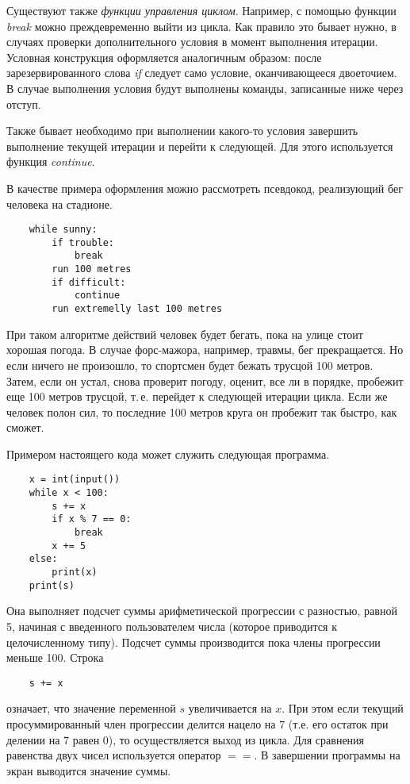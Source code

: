 \documentclass[a4paper, fleqn]{article}
\begin{document}
	Существуют также \emph{функции управления циклом}. Например, с помощью функции \emph{break} можно преждевременно выйти из цикла. Как правило это бывает нужно, в случаях проверки дополнительного условия в момент выполнения итерации. Условная конструкция оформляется аналогичным образом: после зарезервированного слова \emph{if} следует само условие, оканчивающееся двоеточием. В случае выполнения условия будут выполнены команды, записанные ниже через отступ.
	
	Также бывает необходимо при выполнении какого-то условия завершить выполнение текущей итерации и перейти к следующей.
	Для этого используется функция \emph{continue}.
	
	В качестве примера оформления можно рассмотреть псевдокод, реализующий бег человека на стадионе.
	\begin{lstlisting}
	while sunny:
		if trouble:
			break
		run 100 metres
		if difficult:
			continue
		run extremelly last 100 metres	
	\end{lstlisting}
	При таком алгоритме действий человек будет бегать, пока на улице стоит хорошая погода. В случае форс-мажора, например, травмы, бег прекращается. Но если ничего не произошло, то спортсмен будет бежать трусцой 100 метров. Затем, если он устал, снова проверит погоду, оценит, все ли в порядке, пробежит еще 100 метров трусцой, т.\,е. перейдет к следующей итерации цикла. Если же человек полон сил, то последние 100 метров круга он пробежит так быстро, как сможет.
	
	Примером настоящего кода может служить следующая программа.
	\begin{lstlisting}
	x = int(input())
	while x < 100:
		s += x
		if x % 7 == 0:
			break
		x += 5
	else: 
		print(x)
	print(s)
	\end{lstlisting}
	Она выполняет подсчет суммы арифметической прогрессии с разностью, равной 5,  начиная с введенного пользователем числа (которое приводится к целочисленному типу). Подсчет суммы производится пока члены прогрессии меньше 100. Строка
	\begin{lstlisting}
	s += x
	\end{lstlisting}
	означает, что значение переменной $s$  увеличивается на $x$. При этом если текущий просуммированный член прогрессии делится нацело на $7$ (т.е. его остаток при делении на $7$ равен $0$), то осуществляется выход из цикла. Для сравнения равенства двух чисел используется оператор $==$.
	В завершении программы на экран выводится значение суммы.
	
\end{document}
